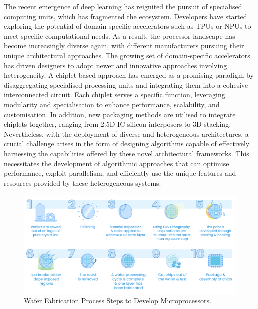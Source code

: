 The recent emergence of deep learning has reignited the pursuit of specialised computing units, which has fragmented the ecosystem. Developers have started exploring the potential of domain-specific accelerators such as TPUs or NPUs to meet specific computational needs. As a result, the processor landscape has become increasingly diverse again, with different manufacturers pursuing their unique architectural approaches. The growing set of domain-specific accelerators has driven designers to adopt newer and innovative approaches involving heterogeneity. A chiplet-based approach has emerged as a promising paradigm by disaggregating specialised processing units and integrating them into a cohesive interconnected circuit. Each chiplet serves a specific function, leveraging modularity and specialisation to enhance performance, scalability, and customisation. In addition, new packaging methods are utilised to integrate chiplets together, ranging from 2.5D-IC silicon interposers to 3D stacking. Nevertheless, with the deployment of diverse and heterogeneous architectures, a crucial challenge arises in the form of designing algorithms capable of effectively harnessing the capabilities offered by these novel architectural frameworks. This necessitates the development of algorithmic approaches that can optimise performance, exploit parallelism, and efficiently use the unique features and resources provided by these heterogeneous systems.


\begin{figure}[tb]
\centering
\includegraphics[width=\linewidth]{Images/image.png}
\caption[Wafer Fabrication]{Wafer Fabrication Process Steps to Develop Microprocessors.}
\label{fig:fabrication}
\end{figure} 

